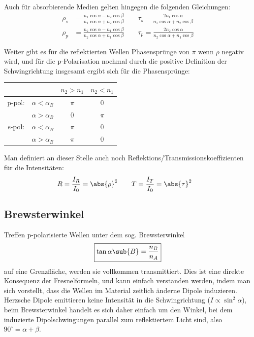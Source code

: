 \documentclass[twocolumn, unnumberedsubsub]{summery_5.0} %
\begin{document}
Auch für absorbierende Medien gelten hingegen die folgenden Gleichungen:
\begin{align*}
    \rho_s &= \frac{n_1\cos\alpha - n_2\cos\beta}{n_1\cos\alpha + n_2\cos\beta}
    \qquad \tau_s = \frac{2 n_1 \cos\alpha}{n_1\cos\alpha + n_2\cos\beta}\\
    \rho_p &= \frac{n_2\cos\alpha - n_1\cos\beta}{n_2\cos\alpha + n_1\cos\beta}
    \qquad\tau_p = \frac{2 n_2 \cos\alpha}{n_2\cos\alpha + n_1\cos\beta}
\end{align*}

Weiter gibt es für die reflektierten Wellen Phasensprünge von $\pi$ wenn $\rho$ negativ wird, und für die p-Polarisation nochmal durch die positive Definition der Schwingrichtung insgesamt ergibt sich für die Phasensprünge:
\begin{table}[H]
\centering
\setlength{\tabcolsep}{6pt}
\renewcommand{\arraystretch}{1.2}
\begin{tabular}{|cc|c|c|}
    \hline
    & & $n_2>n_1$ & $n_2<n_1$\\\hline
    p-pol: & $\alpha<\alpha_B$ & $\pi$ & $0$ \\
    & $\alpha>\alpha_B$ & 0 & $\pi$ \\\hline
    s-pol: & $\alpha<\alpha_B$ & $\pi$ & 0 \\
    & $\alpha>\alpha_B$ & $\pi$ & 0\\\hline
\end{tabular}
\end{table}
Man definiert an dieser Stelle auch noch Reflektions/Transmissionskoeffizienten für die Intensitäten:
\begin{align*}
    R &= \frac{I_R}{I_0} = \abs{\rho}^2\qquad T = \frac{I_T}{I_0} = \abs{\tau}^2
\end{align*}

\subsection{Brewsterwinkel}
Treffen p-polarisierte Wellen unter dem sog. Brewsterwinkel 
\begin{align*}
    \boxed{\tan \alpha\sub{B} = \frac{n_B}{n_A}}
\end{align*}
auf eine Grenzfläche, werden sie vollkommen transmittiert. Dies ist eine direkte Konsequenz der Fresnelformeln, und kann einfach verstanden werden, indem man sich vorstellt, dass die Wellen im Material zeitlich änderne Dipole induzieren. Herzsche Dipole emittieren keine Intensität in die Schwingrichtung ($I\propto\sin^2\alpha$), beim Brewsterwinkel handelt es sich daher einfach um den Winkel, bei dem induzierte Dipolschwingungen parallel zum reflektiertem Licht sind, also $90^\circ = \alpha+\beta$.
\end{document}
